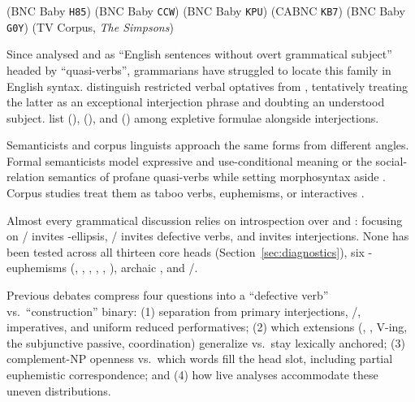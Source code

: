 \documentclass[12pt]{article}
\begin{document}
\ea\label{ex:intro-paradigm}
\ea {} \hfill (BNC Baby \texttt{H85})
\ex {} \hfill (BNC Baby \texttt{CCW})
\ex {} \hfill (BNC Baby \texttt{KPU})
\ex {} \hfill (CABNC \texttt{KB7})
\ex {} \hfill (BNC Baby \texttt{G0Y})
\ex {} \hfill (TV Corpus, \emph{The Simpsons})
\z
\z

Since \textcite[3--7]{quang1971} analysed  and  as \enquote{English sentences without overt grammatical subject} headed by \enquote{quasi-verbs}, grammarians have struggled to locate this family in English syntax. \textcite[236, 944, 1361 n.\ 70]{huddleston2002} distinguish restricted verbal optatives from , tentatively treating the latter as an exceptional interjection phrase and doubting an understood subject. \textcite[852--853]{quirk1985} list  (),  (), and  () among expletive formulae alongside interjections.

Semanticists and corpus linguists approach the same forms from different angles. Formal semanticists model expressive and use-conditional meaning \citep{potts2007,gutzmann2015,gutzmann2019} or the social-relation semantics of profane quasi-verbs while setting morphosyntax aside \citep[4]{portner2026}. Corpus studies treat them as taboo verbs, euphemisms, or interactives \citep{mcenery2006,allanburridge2006,napolihoeksema2009,ljung2011,heine2023interactives}.

Almost every grammatical discussion relies on introspection over  and : focusing on / invites -ellipsis, / invites defective verbs, and  invites interjections. None has been tested across all thirteen core heads (Section~\ref{sec:diagnostics}), six -euphemisms (, , , , , ), archaic , and /.

Previous debates compress four questions into a \enquote{defective verb} vs.\ \enquote{construction} binary: (1) separation from primary interjections, /, imperatives, and uniform reduced performatives; (2) which extensions (, ,  V-ing, the subjunctive passive, coordination) generalize vs.\ stay lexically anchored; (3) complement-NP openness vs.\ which words fill the head slot, including partial euphemistic correspondence; and (4) how live analyses accommodate these uneven distributions.
\end{document}
